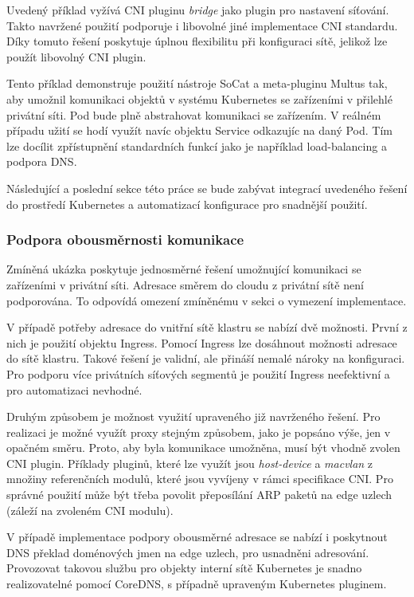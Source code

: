 Uvedený příklad vyžívá CNI pluginu \textit{bridge} jako  plugin pro nastavení síťování. Takto navržené použití podporuje i libovolné jiné implementace CNI standardu. Díky tomuto řešení poskytuje úplnou flexibilitu při konfiguraci sítě, jelikož lze použít libovolný CNI plugin.

\bigskip
Tento příklad demonstruje použití nástroje SoCat a meta-pluginu Multus tak, aby umožnil komunikaci objektů v systému Kubernetes se zařízeními v přilehlé privátní síti. Pod bude plně abstrahovat komunikaci se zařízením. V reálném případu užití se hodí využít navíc objektu Service odkazujíc na daný Pod. Tím lze docílit zpřístupnění standardních funkcí jako je například load-balancing a podpora DNS.

Následující a poslední sekce této práce se bude zabývat integrací uvedeného řešení do prostředí Kubernetes a automatizací konfigurace pro snadnější použití.  

\subsubsection*{Podpora obousměrnosti komunikace}
Zmíněná ukázka poskytuje jednosměrné řešení umožnující komunikaci se zařízeními v privátní síti. Adresace směrem do cloudu z privátní sítě není podporována. To odpovídá omezení zmíněnému v sekci o vymezení implementace.

V případě potřeby adresace do vnitřní sítě klastru se nabízí dvě možnosti. První z nich je použití objektu Ingress. Pomocí Ingress lze dosáhnout možnosti adresace do sítě klastru. Takové řešení je validní, ale přináší nemalé nároky na konfiguraci. Pro podporu více privátních síťových segmentů je použití Ingress neefektivní a pro automatizaci nevhodné.

Druhým způsobem je možnost využití upraveného již navrženého řešení. Pro realizaci je možné využít proxy stejným způsobem, jako je popsáno výše, jen v opačném směru. Proto, aby byla komunikace umožněna, musí být vhodně zvolen  CNI plugin. Příklady pluginů, které lze využít jsou \textit{host-device} a \textit{macvlan} z množiny referenčních modulů, které jsou vyvíjeny v rámci specifikace CNI. Pro správné použití může být třeba povolit přeposílání ARP paketů na edge uzlech (záleží na zvoleném  CNI modulu).

V případě implementace podpory obousměrné adresace se nabízí i poskytnout DNS překlad doménových jmen na edge uzlech, pro usnadněni adresování. Provozovat takovou službu pro objekty interní sítě Kubernetes je snadno realizovatelné pomocí CoreDNS, s případně upraveným Kubernetes pluginem.  

